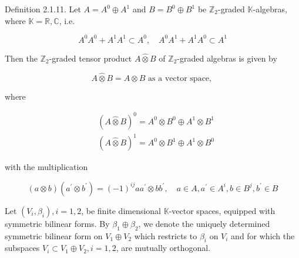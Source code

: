 \documentclass[10pt, letterpaper]{article}
\begin{document}
Definition 2.1.11. Let $A=A^{0} \oplus A^{1}$ and $B=B^{0} \oplus B^{1}$ be $\mathbb{Z}_{2}$-graded $\mathbb{K}$-algebras, where $\mathbb{K}=\mathbb{R}, \mathbb{C}$, i.e.

$$
A^{0} A^{0}+A^{1} A^{1} \subset A^{0}, \quad A^{0} A^{1}+A^{1} A^{0} \subset A^{1}
$$

Then the $\mathbb{Z}_{2}$-graded tensor product $A \hat{\otimes} B$ of $\mathbb{Z}_{2}$-graded algebras is given by

$$
A \hat{\otimes} B=A \otimes B \text { as a vector space, }
$$

where

$$
\begin{aligned}
& (A \hat{\otimes} B)^{0}=A^{0} \otimes B^{0} \oplus A^{1} \otimes B^{1} \\
& (A \hat{\otimes} B)^{1}=A^{0} \otimes B^{1} \oplus A^{1} \otimes B^{0}
\end{aligned}
$$

with the multiplication

$$
(a \otimes b)\left(a^{\prime} \otimes b^{\prime}\right)=(-1)^{i j} a a^{\prime} \otimes b b^{\prime}, \quad a \in A, a^{\prime} \in A^{i}, b \in B^{j}, b^{\prime} \in B
$$

Let $\left(V_{i}, \beta_{i}\right), i=1,2$, be finite dimensional $\mathbb{K}$-vector spaces, equipped with symmetric bilinear forms. By $\beta_{1} \oplus \beta_{2}$, we denote the uniquely determined symmetric bilinear form on $V_{1} \oplus V_{2}$ which restricts to $\beta_{i}$ on $V_{i}$ and for which the subspaces $V_{i} \subset V_{1} \oplus V_{2}, i=1,2$, are mutually orthogonal.
\end{document}

